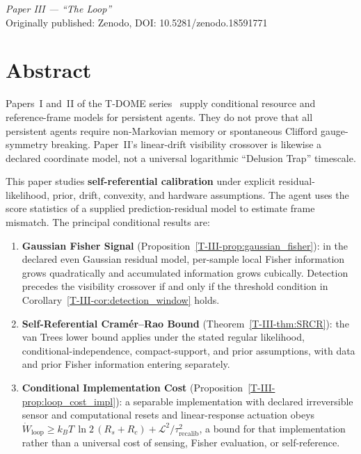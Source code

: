 \documentclass[12pt,a4paper,openany]{book}
\begin{document}
\begin{center}
\textit{Paper III --- ``The Loop''}\\[0.5em]
Originally published: Zenodo, DOI: 10.5281/zenodo.18591771
\end{center}

\bigskip

\section*{Abstract}
Papers~I and~II of the T-DOME
series~\cite{Liu2026TDOME_I,Liu2026TDOME_II} supply conditional
resource and reference-frame models for persistent agents.  They do not
prove that all persistent agents require non-Markovian memory or
spontaneous Clifford gauge-symmetry breaking.  Paper~II's linear-drift
visibility crossover is likewise a declared coordinate model, not a
universal logarithmic ``Delusion Trap'' timescale.

This paper studies \textbf{self-referential calibration} under explicit
residual-likelihood, prior, drift, convexity, and hardware assumptions.
The agent uses the score statistics of a supplied prediction-residual
model to estimate frame mismatch.  The principal conditional results are:
\begin{enumerate}
\item \textbf{Gaussian Fisher Signal}
  (Proposition~\ref{T-III-prop:gaussian_fisher}):
  in the declared even Gaussian residual model, per-sample local Fisher
  information grows quadratically and accumulated information grows
  cubically.  Detection precedes the visibility crossover if and only if
  the threshold condition in Corollary~\ref{T-III-cor:detection_window} holds.
\item \textbf{Self-Referential Cram\'{e}r--Rao Bound}
  (Theorem~\ref{T-III-thm:SRCR}):
  the van Trees lower bound applies under the stated regular likelihood,
  conditional-independence, compact-support, and prior assumptions, with
  data and prior Fisher information entering separately.
\item \textbf{Conditional Implementation Cost}
  (Proposition~\ref{T-III-prop:loop_cost_impl}):
  a separable implementation with declared irreversible sensor and
  computational resets and linear-response actuation obeys
  $\dot{W}_{\mathrm{loop}}
  \geq k_BT\,\ln 2\,(R_s+R_c)
  + \mathcal{L}^2/\tau_{\mathrm{recalib}}^2$,
  a bound for that implementation rather than a universal cost of
  sensing, Fisher evaluation, or self-reference.
\end{enumerate}
\end{document}
